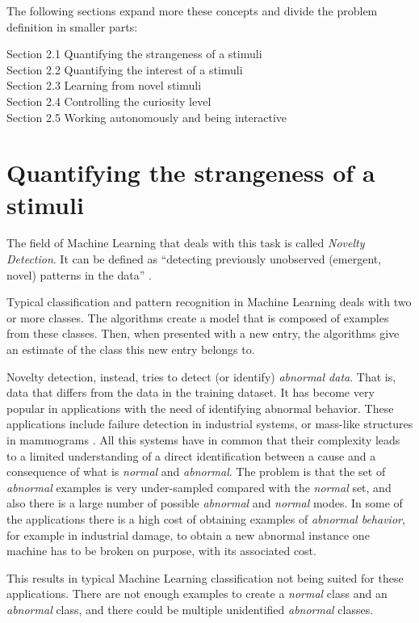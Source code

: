 The following sections expand more these concepts and divide the problem definition in smaller parts:

Section 2.1 Quantifying the strangeness of a stimuli \\
Section 2.2 Quantifying the interest of a stimuli \\
Section 2.3 Learning from novel stimuli \\
Section 2.4 Controlling the curiosity level \\
Section 2.5 Working autonomously and being interactive 
  

\section{Quantifying the strangeness of a stimuli} \label{2.1}

The field of Machine Learning that deals with this task is called \emph{Novelty Detection}. It can be defined as “detecting previously unobserved (emergent, novel) patterns in the data”  \cite{Chandola2009}. \label{novelty}

Typical classification and pattern recognition in Machine Learning deals with two or more classes. The algorithms create a model that is composed of examples from these classes. Then, when presented with a new entry, the algorithms give an estimate of the class this new entry belongs to. 

Novelty detection, instead, tries to detect (or identify) \emph{abnormal data}. That is, data that differs from the data in the training dataset\label{abnormal}. It has become very popular in applications with the need of identifying abnormal behavior. These applications include failure detection in industrial systems, or mass-like structures in mammograms \cite{Pimentel2014}. All this systems have in common that their complexity leads to a limited understanding of a direct identification between a cause and a consequence of what is \emph{normal} and \emph{abnormal}. The problem is that the set of \emph{abnormal} examples is very under-sampled compared with the \emph{normal} set, and also there is a large number of possible \emph{abnormal}  and \emph{normal} modes. In some of the applications there is a high cost of obtaining examples of \emph{abnormal behavior}, for example in industrial damage, to obtain a new abnormal instance one machine has to be broken on purpose, with its associated cost.

This results in typical Machine Learning classification not being suited for these applications. There are not enough examples to create a \emph{normal} class and an \emph{abnormal} class, and there could be multiple unidentified \emph{abnormal} classes.

